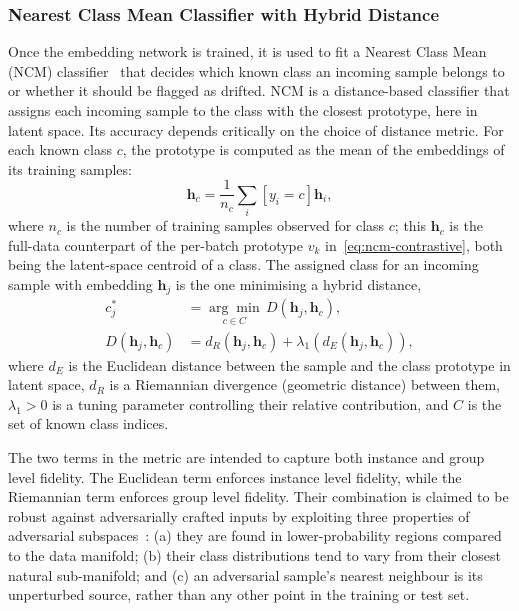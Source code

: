 \subsubsection{Nearest Class Mean Classifier with Hybrid Distance}
Once the embedding network is trained, it is used to fit a Nearest Class Mean (NCM) classifier~\cite{Kuppa_2022} that decides which known class an incoming sample belongs to or whether it should be flagged as drifted. NCM is a distance-based classifier that assigns each incoming sample to the class with the closest prototype, here in latent space. Its accuracy depends critically on the choice of distance metric. For each known class $c$, the prototype is computed as the mean of the embeddings of its training samples:
\begin{equation} \label{eq:ncm-prototype}
    \bm{h}_c = \frac{1}{n_c} \sum_{i}\left[y_i=c\right] \mathbf{h}_i,
\end{equation}
where $n_c$ is the number of training samples observed for class $c$; this $\bm{h}_c$ is the full-data counterpart of the per-batch prototype $v_k$ in~\cref{eq:ncm-contrastive}, both being the latent-space centroid of a class. The assigned class for an incoming sample with embedding $\mathbf{h}_j$ is the one minimising a hybrid distance,
\begin{align}
    c_j^* &= \underset{c\in C}{\arg\min}\,D(\mathbf{h}_j, \bm{h}_c), \label{eq:ncm-classification}\\
    D(\mathbf{h}_j, \bm{h}_c) &= d_R(\mathbf{h}_j, \bm{h}_c) + \lambda_1(d_E(\mathbf{h}_j, \bm{h}_c)), \label{eq:hybrid-distance}
\end{align}
where $d_E$ is the Euclidean distance between the sample and the class prototype in latent space, $d_R$ is a Riemannian divergence (geometric distance) between them, $\lambda_1 > 0$ is a tuning parameter controlling their relative contribution, and $C$ is the set of known class indices.

The two terms in the metric are intended to capture both instance and group level fidelity. The Euclidean term enforces instance level fidelity, while the Riemannian term enforces group level fidelity. Their combination is claimed to be robust against adversarially crafted inputs by exploiting three properties of adversarial subspaces~\cite{Kuppa_2022}: (a) they are found in lower-probability regions compared to the data manifold; (b) their class distributions tend to vary from their closest natural sub-manifold; and (c) an adversarial sample's nearest neighbour is its unperturbed source, rather than any other point in the training or test set.

